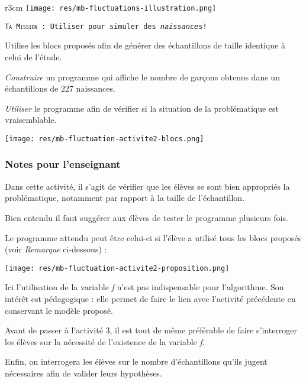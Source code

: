 \begin{wrapfigure}{r}{3cm}
    \texttt{[image: res/mb-fluctuations-illustration.png]}
\end{wrapfigure}

\begin{eleve}
    \texttt{\textsc{Ta Mission} : Utiliser \mb pour simuler des \emph{naissances}!}

    Utilise les blocs proposés afin de générer des échantillons de taille identique à celui de l'étude.

    \emph{Construire} un programme qui affiche le nombre de garçons obtenus dans un échantillons de 227 naissances.

    \emph{Utiliser} le programme afin de vérifier si la situation de la problématique est vraisemblable.

    \texttt{[image: res/mb-fluctuation-activite2-blocs.png]}

\end{eleve}

\newpage

\subsubsection{Notes pour l'enseignant}

%
%
\begin{methode}
Dans cette activité, il s'agit de vérifier que les élèves se sont bien appropriés la problématique, notamment par rapport à la taille de l'échantillon.

Bien entendu il faut suggérer aux élèves de tester le programme plusieurs fois.

Le programme attendu peut être celui-ci si l'élève a utilisé tous les blocs proposés (voir \emph{Remarque} ci-dessous) :

    \texttt{[image: res/mb-fluctuation-activite2-proposition.png]}

\end{methode}


\begin{remarque}
    Ici l'utilisation de la variable \emph{f} n'est pas indispensable pour l'algorithme. Son intérêt est pédagogique : elle permet de faire le lien avec l'activité précédente en conservant le modèle proposé.

   Avant de passer à l'activité 3, il est tout de même préférable de faire s'interroger les élèves sur la nécessité de l'existence de la variable \emph{f}.

   Enfin, on interrogera les élèves sur le nombre d'échantillons qu'ils jugent nécessaires afin de valider leurs hypothèses.
\end{remarque}


